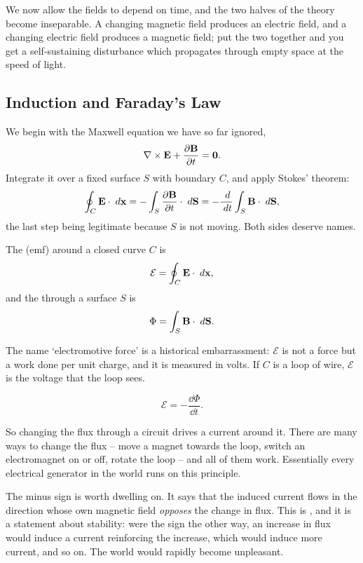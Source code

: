 \documentclass[a4paper]{scrartcl}
\begin{document}
We now allow the fields to depend on time, and the two halves of the theory become inseparable. A changing magnetic field produces an electric field, and a changing electric field produces a magnetic field; put the two together and you get a self-sustaining disturbance which propagates through empty space at the speed of light.

\subsection{Induction and Faraday's Law}

We begin with the Maxwell equation we have so far ignored,
$$
\nabla \times \mathbf{E} + \frac{\partial \mathbf{B}}{\partial t} = \mathbf{0}.
$$
Integrate it over a fixed surface $S$ with boundary $C$, and apply Stokes' theorem:
$$
\oint_C \mathbf{E}\cdot \; d \mathbf{x} = -\int_S \frac{\partial \mathbf{B}}{\partial t}\cdot \; d \mathbf{S} = -\frac{\; d}{\; d t}\int_S \mathbf{B}\cdot \; d \mathbf{S},
$$
the last step being legitimate because $S$ is not moving. Both sides deserve names.

\begin{definition}
	The  (emf) around a closed curve $C$ is
	$$
	\mathcal{E} = \oint_C \mathbf{E}\cdot \; d \mathbf{x},
	$$
	and the  through a surface $S$ is
	$$
	\Phi = \int_S \mathbf{B}\cdot \; d \mathbf{S}.
	$$
\end{definition}

The name `electromotive force' is a historical embarrassment: $\mathcal{E}$ is not a force but a work done per unit charge, and it is measured in volts. If $C$ is a loop of wire, $\mathcal{E}$ is the voltage that the loop sees.

\begin{law}
	$$
	\mathcal{E} = -\frac{\dd \Phi}{\dd t}.
	$$
\end{law}

So changing the flux through a circuit drives a current around it. There are many ways to change the flux -- move a magnet towards the loop, switch an electromagnet on or off, rotate the loop -- and all of them work. Essentially every electrical generator in the world runs on this principle.

The minus sign is worth dwelling on. It says that the induced current flows in the direction whose own magnetic field \emph{opposes} the change in flux. This is , and it is a statement about stability: were the sign the other way, an increase in flux would induce a current reinforcing the increase, which would induce more current, and so on. The world would rapidly become unpleasant.
\end{document}
